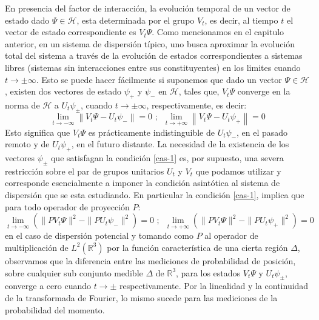 \documentclass[12pt]{book}
\numberwithin{equation}{chapter}
\def\R{\mathbb{R}}
\def\rar{\rightarrow}
\def\H{\mathcal{H}}
\begin{document}
En presencia del factor de interacci\'on, la evoluci\'on temporal de un vector de estado dado $\Psi \in \H$, esta determinada por el grupo $V_{t}$, es decir, al tiempo $t$ el vector de estado correspondiente es $V_{t} \Psi$. Como mencionamos en el capitulo anterior, en un sistema de dispersi\'on t\'ipico, uno busca aproximar la evoluci\'on total del sistema a trav\'es de la evoluci\'on de estados correspondientes a sistemas libres (sistemas sin interacciones entre sus constituyentes) en los limites cuando $ t \rar \pm \infty $. Esto se puede hacer f\'acilmente si suponemos que dado un vector $\Psi \in \H$, existen dos vectores de estado $ \psi_{+} $ y $\psi_{-}$ en $\H$, tales que, $V_{t} \Psi$ converge en la norma de $\H$ a $U_{t} \psi_{\pm}$, cuando $t \rar \pm \infty$, respectivamente, es decir: 
\begin{equation}\label{cas-1}
\lim_{t \rar -\infty} \left\| V_{t}\Psi - U_{t}\psi_{-}  \right\|=0 \,\,;\,\,\, \lim_{t \rar +\infty} \left\| V_{t}\Psi - U_{t}\psi_{+}  \right\|=0
\end{equation}
Esto significa que $V_{t}\Psi$ es pr\'acticamente indistinguible de $U_{t}\psi_{-}$, en el pasado remoto y de $U_{t}\psi_{+} $, en el futuro distante. La necesidad de la existencia de los vectores $\psi_{\pm}$ que satisfagan la condici\'on \eqref{cas-1} es, por supuesto, una severa restricci\'on sobre el par de grupos unitarios $U_{t}$ y $V_{t}$ que podamos utilizar y corresponde esencialmente a imponer la condici\'on asint\'otica al sistema de dispersi\'on que se esta estudiando. En particular la condici\'on \eqref{cas-1}, implica que para todo operador de proyecci\'on $P$:
\begin{equation}
\lim_{t \rar -\infty} \left( \|PV_{t}\Psi \|^{2} - \| PU_{t}\psi_{-} \|^{2}  \right)=0 \,\,;\,\,\, \lim_{t \rar +\infty} \left( \|PV_{t}\Psi \|^{2} - \| PU_{t}\psi_{+} \|^{2}  \right)=0
\end{equation}
en el caso de dispersi\'on potencial y tomando como $P$ al operador de multiplicaci\'on de $L^{2}(\R^{3})$ por la funci\'on caracter\'istica de una cierta regi\'on $\Delta$, observamos que la diferencia entre las mediciones de probabilidad de posici\'on, sobre cualquier sub conjunto medible $\Delta$ de $\R^{3}$, para los estados $V_{t} \Psi$ y $ U_{t}\psi_{\pm} $, converge a cero cuando $t \rar \pm$ respectivamente. Por la linealidad y la continuidad de la transformada de Fourier, lo mismo sucede para las mediciones de la probabilidad del momento.\\
\end{document}

